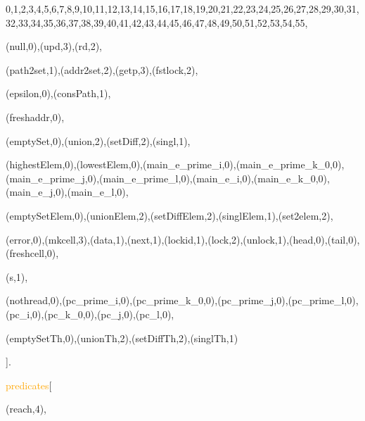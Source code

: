 
    0,1,2,3,4,5,6,7,8,9,10,11,12,13,14,15,16,17,18,19,20,21,22,23,24,25,26,27,28,29,30,31,32,33,34,35,36,37,38,39,40,41,42,43,44,45,46,47,48,49,50,51,52,53,54,55,


    


(null,0),(upd,3),(rd,2),




(path2set,1),(addr2set,2),(getp,3),(fstlock,2),


(epsilon,0),(consPath,1),


(freshaddr,0),


(emptySet,0),(union,2),(setDiff,2),(singl,1),


(highestElem,0),(lowestElem,0),(main\_e\_prime\_i,0),(main\_e\_prime\_k\_0,0),(main\_e\_prime\_j,0),(main\_e\_prime\_l,0),(main\_e\_i,0),(main\_e\_k\_0,0),(main\_e\_j,0),(main\_e\_l,0),


(emptySetElem,0),(unionElem,2),(setDiffElem,2),(singlElem,1),(set2elem,2),


(error,0),(mkcell,3),(data,1),(next,1),(lockid,1),(lock,2),(unlock,1),(head,0),(tail,0),(freshcell,0),


(s,1),


(nothread,0),(pc\_prime\_i,0),(pc\_prime\_k\_0,0),(pc\_prime\_j,0),(pc\_prime\_l,0),(pc\_i,0),(pc\_k\_0,0),(pc\_j,0),(pc\_l,0),


(emptySetTh,0),(unionTh,2),(setDiffTh,2),(singlTh,1)

].


\textcolor{orange}{predicates}[


    


    


    (reach,4),

